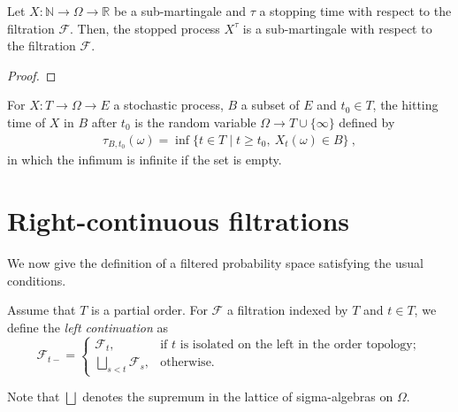 \begin{lemma}\label{lem:Submartingale.stoppedProcess}
  \mathlibok
Let $X : \mathbb{N} \to \Omega \to \mathbb{R}$ be a sub-martingale and $\tau$ a stopping time with respect to the filtration $\mathcal{F}$.
Then, the stopped process $X^{\tau}$ is a sub-martingale with respect to the filtration $\mathcal{F}$.
\end{lemma}

\begin{proof}\leanok

\end{proof}


\begin{definition}\label{def:hittingAfter}
  \mathlibok
For $X : T \to \Omega \to E$ a stochastic process, $B$ a subset of $E$ and $t_0 \in T$, the hitting time of $X$ in $B$ after $t_0$ is the random variable $\Omega \to T\cup\{\infty\}$ defined by
\begin{align*}
  \tau_{B, t_0}(\omega) = \inf\{t \in T \mid t \ge t_0, \: X_t(\omega) \in B\} \: ,
\end{align*}
in which the infimum is infinite if the set is empty.
\end{definition}



\section{Right-continuous filtrations}

We now give the definition of a filtered probability space satisfying the usual conditions.


\begin{definition}\label{def:leftLimitFiltration}
Assume that $T$ is a partial order. For $\mathcal{F}$ a filtration indexed by $T$ and $t \in T$, we define the \emph{left continuation} as
$$\mathcal{F}_{t-} =
  \begin{cases}
    \mathcal{F}_t, & \text{if $t$ is isolated on the left in the order topology}; \\
    \bigsqcup_{s < t} \mathcal{F}_s, & \text{otherwise}.
  \end{cases}
$$

Note that $\bigsqcup$ denotes the supremum in the lattice of sigma-algebras on $\Omega$.
\end{definition}


